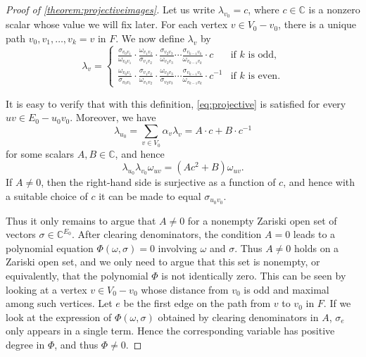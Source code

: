 \documentclass[10pt,a4paper]{amsart}
\newcommand{\CC}{\mathbb{C}}
\begin{document}
\begin{proof}[Proof of \cref{theorem:projectiveimages}]
    Let us write $\lambda_{v_0} = c$, where $c \in \CC$ is a nonzero scalar whose value we will fix later. For each vertex $v \in V_0 - v_0$, there is a unique path $v_0, v_1, \ldots, v_k = v$ in $F$. We now define $\lambda_v$ by
    \[\lambda_v = 
    \begin{cases}
    \frac{\sigma_{v_0v_1}}{\omega_{v_0v_1}} \cdot \frac{\omega_{v_1v_2}}{\sigma_{v_1v_2}} \cdot \frac{\sigma_{v_2v_3}}{\omega_{v_2v_3}} \cdots \frac{\sigma_{v_{k-1}v_k}}{\omega_{v_{k-1}v_k}} \cdot c  &\text{if } k \text{ is odd,}  \\ \frac{\omega_{v_0v_1}}{\sigma_{v_0v_1}} \cdot \frac{\sigma_{v_1v_2}}{\omega_{v_1v_2}} \cdot \frac{\omega_{v_2v_3}}{\sigma_{v_2v_3}} \cdots \frac{\sigma_{v_{k-1}v_k}}{\omega_{v_{k-1}v_k}} \cdot c^{-1} &\text{if } k \text{ is even.}
    \end{cases}\]

    It is easy to verify that with this definition, \cref{eq:projective} is satisfied for every $uv \in E_0 - u_0v_0$. Moreover, we have \[\lambda_{u_0} = \sum_{v \in V_0}\alpha_v \lambda_v = A \cdot c + B \cdot c^{-1}\] for some scalars $A,B \in \CC$, and hence \[\lambda_{u_0}\lambda_{v_0}\omega_{uv} = (Ac^2 + B) \omega_{uv}.\] If $A \neq 0$, then the right-hand side is surjective as a function of $c$, and hence with a suitable choice of $c$ it can be made to equal $\sigma_{u_0v_0}$. 
    
    Thus it only remains to argue that $A \neq 0$ for a nonempty Zariski open set of vectors $\sigma \in \CC^{E_0}$. After clearing denominators, the condition $A = 0$ leads to a polynomial equation $\Phi(\omega,\sigma) = 0$ involving $\omega$ and $\sigma$. Thus $A \neq 0$ holds on a Zariski open set, and we only need to argue that this set is nonempty, or equivalently, that the polynomial $\Phi$ is not identically zero. This can be seen by looking at a vertex $v \in V_0 - v_0$ whose distance from $v_0$ is odd and maximal among such vertices. Let $e$ be the first edge on the path from $v$ to $v_0$ in $F$. If we look at the expression of $\Phi(\omega,\sigma)$ obtained by clearing denominators in $A$, $\sigma_e$ only appears in a single term. Hence the corresponding variable has positive degree in $\Phi$, and thus $\Phi \neq 0$.
\end{proof}
\end{document}
